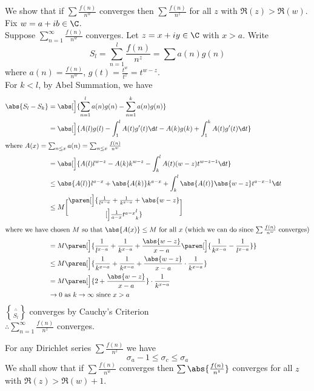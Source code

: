 We show that if $\sum\frac{f(n)}{n^w}$ converges then $\sum\frac{f(n)}{n^z}$ for all $z$ with $\Re(z)>\Re(w)$. \\
Fix $w=a+ib\in\C$. \\
Suppose $\sum_{n=1}^\infty\frac{f(n)}{n^w}$ converges.  Let $z=x+iy\in\C$ with $x>a$.  Write
\[ S_l = \sum_{n=1}^l \frac{f(n)}{n^z} = \sum a(n) g(n) \]
where $a(n)=\frac{f(n)}{n^w}$, $g(t)=\frac{t^w}{t^z}=t^{w-z}$. \\
For $k<l$, by Abel Summation, we have
\begin{align*}
\abs{S_l-S_k} &= \abs[\Big]{\sum_{n=1}^l a(n)g(n) - \sum_{n=1}^k a(n)g(n)} \\
&= \abs[\Big]{A(l)g(l) - \int_1^l A(t)g'(t)\d t - A(k)g(k) + \int_1^k A(t)g'(t)\d t} \\ \intertext{where $A(x)=\sum_{n\leq x}a(n)=\sum_{n\leq x}\frac{f(n)}{n^w}$}
&= \abs[\Big]{A(l)l^{w-z}-A(k)k^{w-z}-\int_k^l A(t)(w-z)t^{w-z-1}\d t} \\
&\leq \abs{A(l)}l^{a-x} + \abs{A(k)}k^{a-x} + \int_k^l \abs{A(t)}\abs{w-z}t^{a-x-1}\d t \\
&\leq M\paren[\Big]{\frac1{l^{x-a}}+\frac1{k^{x-a}}+\abs{w-z}\brack[\Big]{\frac{1}{a-x}t^{a-x}}_k^l} \\ \intertext{where we have chosen $M$ so that $\abs{A(x)}\leq M$ for all $x$ (which we can do since $\sum\frac{f(n)}{n^w}$ converges)}
&= M\paren[\Big]{\frac1{l^{x-a}}+\frac1{k^{x-a}}+\frac{\abs{w-z}}{x-a}\paren[\Big]{\frac1{k^{x-a}}-\frac1{l^{x-a}}}} \\
&\leq M\paren[\Big]{\frac1{k^{x-a}}+\frac1{k^{x-a}}+\frac{\abs{w-z}}{x-a}\cdot\frac1{k^{x-a}}} \\
&= M\paren[\Big]{2+\frac{\abs{w-z}}{x-a}}\cdot\frac{1}{k^{x-a}} \\
&\to 0 \text{ as $k\to\infty$ since $x>a$}
\end{align*}
$\therefore\brace{S_l}$ converges by Cauchy's Criterion \\
$\therefore\sum_{n=1}^\infty\frac{f(n)}{n^z}$ converges.

\thm For any Dirichlet series $\sum\frac{f(n)}{n^z}$ we have
\[ \sigma_a - 1 \leq \sigma_c \leq \sigma_a \]
\pf We shall show that if $\sum\frac{f(n)}{n^w}$ converges then $\sum\abs{\frac{f(n)}{n^z}}$ converges for all $z$ with $\Re(z)>\Re(w)+1$.

